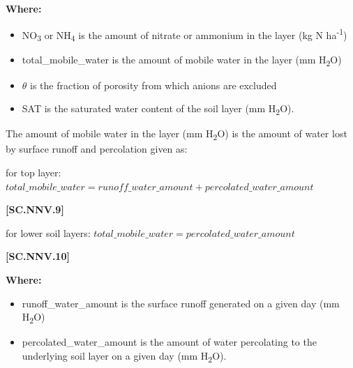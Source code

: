         \textbf{Where:}
            
        \begin{itemize}
            \item NO\textsubscript{3} or NH\textsubscript{4} is the amount of nitrate or ammonium in the layer (kg N ha\textsuperscript{-1})
            \item total\_mobile\_water is the amount of mobile water in the layer (mm H\textsubscript{2}O)
            \item \(\theta\) is the fraction of porosity from which anions are excluded
            \item SAT is the saturated water content of the soil layer (mm H\textsubscript{2}O).
        \end{itemize}
    \vspace{0.5cm}

 The amount of mobile water in the layer (mm H\textsubscript{2}O) is the amount of water lost by surface runoff and percolation given as:   
\vspace{0.5cm}
            
    \begin{center}
    for top layer:
 \(total\_mobile\_water=runoff\_water\_amount + percolated\_water\_amount\)

    \end{center}
        \vspace{0.5cm} 
    
            {\raggedleft \textbf{[SC.NNV.9]}\par}
            \vspace{0.5cm}

    \begin{center}
    for lower soil layers:
 \(total\_mobile\_water=percolated\_water\_amount\)

    \end{center}
        \vspace{0.5cm} 
    
            {\raggedleft \textbf{[SC.NNV.10]}\par}
            \vspace{0.5cm}

        \textbf{Where:}
            
        \begin{itemize}
            \item runoff\_water\_amount is the surface runoff generated on a given day (mm H\textsubscript{2}O)
            \item percolated\_water\_amount is the amount of water percolating to the underlying soil layer on a given day (mm H\textsubscript{2}O). 
        \end{itemize}
    \vspace{0.5cm}


